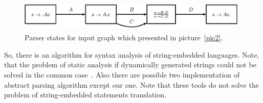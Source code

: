 \begin{figure}
    \begin{center}
        \includegraphics[width=11cm,height=1.5cm]{graphs/simple_grammar_items.eps}
        \caption{Parser states for input graph which presented in picture~\ref{pic2}.}
        \label{pic3}
    \end{center}
\end{figure}

So, there is an algorithm for syntax analysis of string-embedded languages. Note, that the problem of static 
analysis if dynamically generated strings could not be solved in the common case~\cite{ALVOR2}. Also there are 
possible two implementation of abstract parsing algorithm except our one. Note that these tools do not solve 
the problem of string-embedded statements translation.


